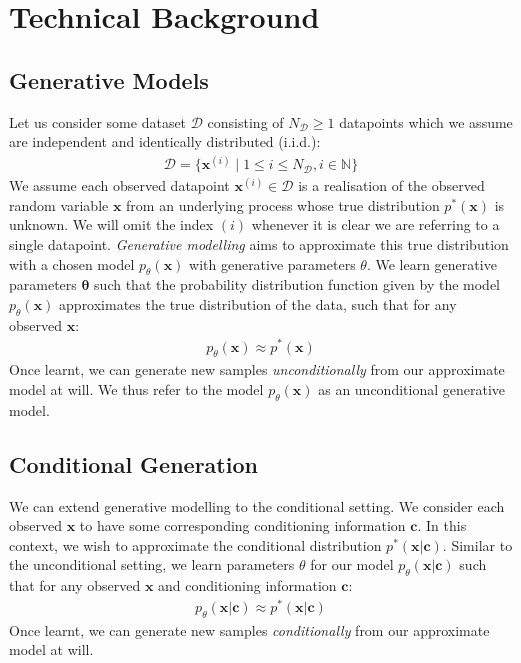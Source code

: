 \documentclass[ oneside,%
                    author={George Herbert},
                    degree={MSci},
                     title={Diffusion Models for Time-Evolving Precipitation Fields},
                  subtitle={}]{dissertation}
\begin{document}
\chapter{Technical Background}
\label{chap:background}

\section{Generative Models}
\label{sec:background_generative}

Let us consider some dataset $\mathcal{D}$ consisting of $N_{\mathcal{D}}\ge1$ datapoints which we assume are independent and identically distributed (i.i.d.):
\begin{align}
      \mathcal{D}=\{\mathbf{x}^{(i)}\mid 1 \le i \le N_{\mathcal{D}}, i \in \mathbb{N} \}
\end{align}
We assume each observed datapoint $\mathbf{x}^{(i)}\in\mathcal{D}$ is a realisation of the observed random variable $\mathbf{x}$ from an underlying process whose true distribution $p^*(\mathbf{x})$ is unknown. We will omit the index $(i)$ whenever it is clear we are referring to a single datapoint. \textit{Generative modelling} aims to approximate this true distribution with a chosen model $p_\theta(\mathbf{x})$ with generative parameters $\theta$. We learn generative parameters $\mathbf{\theta}$ such that the probability distribution function given by the model $p_\theta(\mathbf{x})$ approximates the true distribution of the data, such that for any observed $\mathbf{x}$:
\begin{align}
      p_\theta(\mathbf{x}) \approx p^*(\mathbf{x})
\end{align}
Once learnt, we can generate new samples \textit{unconditionally} from our approximate model at will. We thus refer to the model $p_\theta(\mathbf{x})$ as an unconditional generative model.

\section{Conditional Generation}
\label{sec:background_conditional}

We can extend generative modelling to the conditional setting. We consider each observed $\mathbf{x}$ to have some corresponding conditioning information $\mathbf{c}$. In this context, we wish to approximate the conditional distribution $p^*(\mathbf{x}|\mathbf{c})$. Similar to the unconditional setting, we learn parameters $\theta$ for our model $p_\theta(\mathbf{x}|\mathbf{c})$ such that for any observed $\mathbf{x}$ and conditioning information $\mathbf{c}$:
\begin{align}
      p_\theta(\mathbf{x}|\mathbf{c})\approx p^*(\mathbf{x}|\mathbf{c})
\end{align}
Once learnt, we can generate new samples \textit{conditionally} from our approximate model at will.
\end{document}
